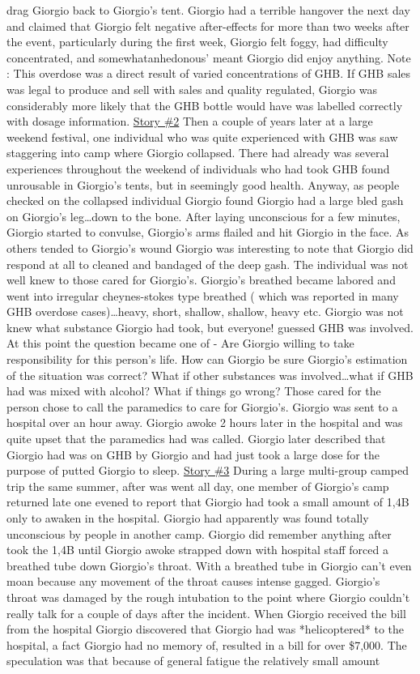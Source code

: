 \documentclass[12pt]{book}
\begin{document}
drag Giorgio back to Giorgio's tent. Giorgio had a terrible hangover the next day and claimed that Giorgio felt negative after-effects for more than two weeks after the event, particularly during the first week, Giorgio felt foggy, had difficulty concentrated, and somewhatanhedonous' meant Giorgio did enjoy anything. Note : This overdose was a direct result of varied concentrations of GHB. If GHB sales was legal to produce and sell with sales and quality regulated, Giorgio was considerably more likely that the GHB bottle would have was labelled correctly with dosage information. \underline{Story \#2} Then a couple of years later at a large weekend festival, one individual who was quite experienced with GHB was saw staggering into camp where Giorgio collapsed. There had already was several experiences throughout the weekend of individuals who had took GHB found unrousable in Giorgio's tents, but in seemingly good health. Anyway, as people checked on the collapsed individual Giorgio found Giorgio had a large bled gash on Giorgio's leg\ldots down to the bone. After laying unconscious for a few minutes, Giorgio started to convulse, Giorgio's arms flailed and hit Giorgio in the face. As others tended to Giorgio's wound Giorgio was interesting to note that Giorgio did respond at all to cleaned and bandaged of the deep gash. The individual was not well knew to those cared for Giorgio's. Giorgio's breathed became labored and went into irregular cheynes-stokes type breathed ( which was reported in many GHB overdose cases)\ldots heavy, short, shallow, shallow, heavy etc. Giorgio was not knew what substance Giorgio had took, but everyone! guessed GHB was involved. At this point the question became one of - Are Giorgio willing to take responsibility for this person's life. How can Giorgio be sure Giorgio's estimation of the situation was correct? What if other substances was involved\ldots what if GHB had was mixed with alcohol? What if things go wrong? Those cared for the person chose to call the paramedics to care for Giorgio's. Giorgio was sent to a hospital over an hour away. Giorgio awoke 2 hours later in the hospital and was quite upset that the paramedics had was called. Giorgio later described that Giorgio had was on GHB by Giorgio and had just took a large dose for the purpose of putted Giorgio to sleep. \underline{Story \#3} During a large multi-group camped trip the same summer, after was went all day, one member of Giorgio's camp returned late one evened to report that Giorgio had took a small amount of 1,4B only to awaken in the hospital. Giorgio had apparently was found totally unconscious by people in another camp. Giorgio did remember anything after took the 1,4B until Giorgio awoke strapped down with hospital staff forced a breathed tube down Giorgio's throat. With a breathed tube in Giorgio can't even moan because any movement of the throat causes intense gagged. Giorgio's throat was damaged by the rough intubation to the point where Giorgio couldn't really talk for a couple of days after the incident. When Giorgio received the bill from the hospital Giorgio discovered that Giorgio had was *helicoptered* to the hospital, a fact Giorgio had no memory of, resulted in a bill for over \$7,000. The speculation was that because of general fatigue the relatively small amount 
\end{document}
